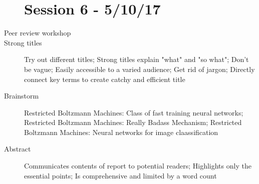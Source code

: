 \documentclass[10pt]{article}
\begin{document}
\begin{description}
\section{Session 6 - 5/10/17}
\item[Peer review workshop]
\item[Strong titles]
    Try out different titles;
    Strong titles explain "what" and "so what";
    Don't be vague;
    Easily accessible to a varied audience;
    Get rid of jargon;
    Directly connect key terms to create catchy and efficient title
\item[Brainstorm]
    Restricted Boltzmann Machines: Class of fast training neural networks;
    Restricted Boltzmann Machines: Really Badass Mechanism;
    Restricted Boltzmann Machines: Neural networks for image claassification
\item[Abstract]
    Communicates contents of report to potential readers;
    Highlights only the essential points;
    Is comprehensive and limited by a word count
\end{description}
\end{document}
